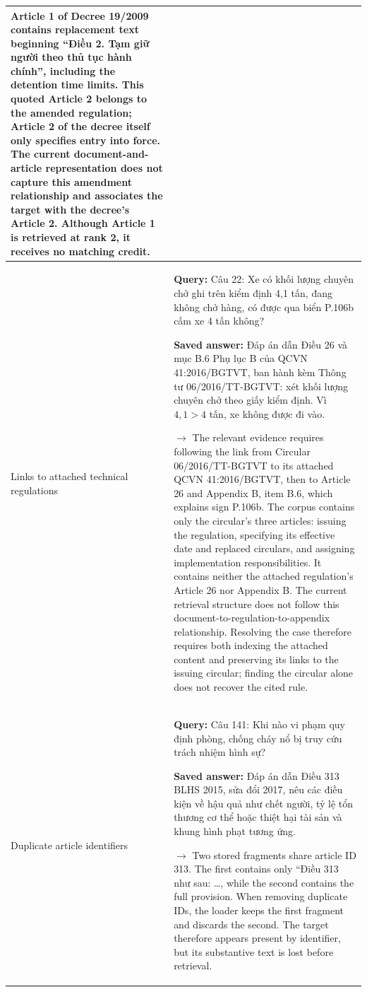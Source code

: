 \begin{longtable}{@{}>{\raggedright\arraybackslash}p{3cm}>{\raggedright\arraybackslash}p{12.25cm}@{}}
Article 1 of Decree 19/2009 contains replacement text beginning ``Điều 2. Tạm giữ người theo thủ tục hành chính'', including the detention time limits. This quoted Article 2 belongs to the amended regulation; Article 2 of the decree itself only specifies entry into force. The current document-and-article representation does not capture this amendment relationship and associates the target with the decree's Article 2. Although Article 1 is retrieved at rank 2, it receives no matching credit.\\
\midrule
Links to attached technical regulations &
\textbf{Query:} Câu 22: Xe có khối lượng chuyên chở ghi trên kiểm định 4,1 tấn, đang không chở hàng, có được qua biển P.106b cấm xe 4 tấn không?\par\smallskip
\textbf{Saved answer:} Đáp án dẫn Điều 26 và mục B.6 Phụ lục B của QCVN 41:2016/BGTVT, ban hành kèm Thông tư 06/2016/TT-BGTVT: xét khối lượng chuyên chở theo giấy kiểm định. Vì \(4{,}1>4\) tấn, xe không được đi vào.\par\smallskip
\(\rightarrow\) The relevant evidence requires following the link from Circular 06/2016/TT-BGTVT to its attached QCVN 41:2016/BGTVT, then to Article 26 and Appendix B, item B.6, which explains sign P.106b. The corpus contains only the circular's three articles: issuing the regulation, specifying its effective date and replaced circulars, and assigning implementation responsibilities. It contains neither the attached regulation's Article 26 nor Appendix B. The current retrieval structure does not follow this document-to-regulation-to-appendix relationship. Resolving the case therefore requires both indexing the attached content and preserving its links to the issuing circular; finding the circular alone does not recover the cited rule.\\
\midrule
Duplicate article identifiers &
\textbf{Query:} Câu 141: Khi nào vi phạm quy định phòng, chống cháy nổ bị truy cứu trách nhiệm hình sự?\par\smallskip
\textbf{Saved answer:} Đáp án dẫn Điều 313 BLHS 2015, sửa đổi 2017, nêu các điều kiện về hậu quả như chết người, tỷ lệ tổn thương cơ thể hoặc thiệt hại tài sản và khung hình phạt tương ứng.\par\smallskip
\(\rightarrow\) Two stored fragments share article ID 313. The first contains only ``Điều 313 như sau: \ldots{}, while the second contains the full provision. When removing duplicate IDs, the loader keeps the first fragment and discards the second. The target therefore appears present by identifier, but its substantive text is lost before retrieval.\\

\end{longtable}
